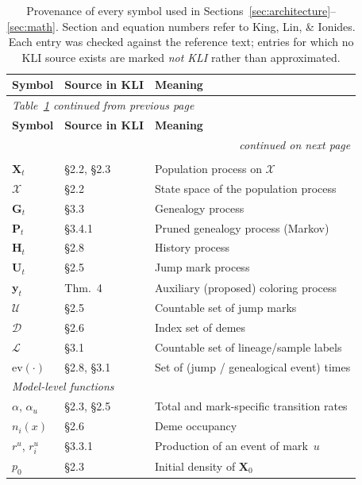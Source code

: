 \documentclass[11pt,leqno]{article}
\newcommand{\Xr}{\mathbf{X}}        %
\newcommand{\Gr}{\mathbf{G}}        %
\renewcommand{\Pr}{\mathbf{P}}      %
\newcommand{\Hr}{\mathbf{H}}        %
\newcommand{\Ur}{\mathbf{U}}        %
\newcommand{\yr}{\mathbf{y}}        %
\newcommand{\Xspace}{\mathcal{X}}   %
\newcommand{\Jumps}{\mathcal{U}}    %
\newcommand{\Demes}{\mathcal{D}}    %
\theoremstyle{plain}
\theoremstyle{definition}
\begin{document}
\footnotesize
\renewcommand{\arraystretch}{1.15}
\begin{longtable}{@{}p{}p{}p{}@{}}
\caption{Provenance of every symbol used in
Sections~\ref{sec:architecture}--\ref{sec:math}.  Section and equation
numbers refer to King, Lin, \& Ionides.  Each entry was checked
against the reference text; entries for which no KLI source exists are
marked \emph{not KLI} rather than approximated.}
\label{tab:notation}\\
\toprule
\textbf{Symbol} & \textbf{Source in KLI} & \textbf{Meaning} \\
\midrule
\endfirsthead
\multicolumn{3}{l}{\textit{Table~\ref{tab:notation} continued from previous page}}\\
\toprule
\textbf{Symbol} & \textbf{Source in KLI} & \textbf{Meaning} \\
\midrule
\endhead
\midrule
\multicolumn{3}{r}{\textit{continued on next page}}\\
\endfoot
\bottomrule
\endlastfoot
\multicolumn{3}{l}{\textit{Processes and spaces}}\\
$\Xr_t$ & \S2.2, \S2.3 & Population process on $\Xspace$ \\
$\Xspace$ & \S2.2 & State space of the population process \\
$\Gr_t$ & \S3.3 & Genealogy process \\
$\Pr_t$ & \S3.4.1 & Pruned genealogy process (Markov) \\
$\Hr_t$ & \S2.8 & History process \\
$\Ur_t$ & \S2.5 & Jump mark process \\
$\yr_t$ & Thm.~4 & Auxiliary (proposed) coloring process \\
$\Jumps$ & \S2.5 & Countable set of jump marks \\
$\Demes$ & \S2.6 & Index set of demes \\
$\mathcal{L}$ & \S3.1 & Countable set of lineage/sample labels \\
$\mathrm{ev}(\cdot)$ & \S2.8, \S3.1 & Set of (jump / genealogical event) times \\
\midrule
\multicolumn{3}{l}{\textit{Model-level functions}}\\
$\alpha$, $\alpha_u$ & \S2.3, \S2.5 & Total and mark-specific transition rates \\
$n_i(x)$ & \S2.6 & Deme occupancy \\
$r^u$, $r^u_i$ & \S3.3.1 & Production of an event of mark~$u$ \\
$p_0$ & \S2.3 & Initial density of $\Xr_0$ \\

\end{longtable}
\end{document}

